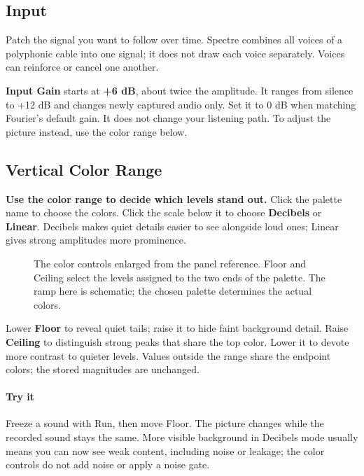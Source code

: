 \begingroup
\setlength{\parindent}{0pt}
\setlength{\parskip}{4pt}
\clearpage
\subsection{Input}

Patch the signal you want to follow over time. Spectre combines all voices
of a polyphonic cable into one signal; it does not draw each voice separately.
Voices can reinforce or cancel one another.

\textbf{Input Gain} starts at \textbf{+6 dB}, about twice the amplitude.
It ranges from silence to +12 dB and changes newly captured audio only.
Set it to 0 dB when matching Fourier's default gain. It does not change your
listening path. To adjust the picture instead, use the color range below.

\subsection{Vertical Color Range}

\textbf{Use the color range to decide which levels stand out.} Click the
palette name to choose the colors. Click the scale below it to choose
\textbf{Decibels} or \textbf{Linear}. Decibels makes quiet details easier
to see alongside loud ones; Linear gives strong amplitudes more prominence.

\begin{figure}[!htp]
\centering

\caption{The color controls enlarged from the panel reference. Floor and
Ceiling select the levels assigned to the two ends of the palette. The
ramp here is schematic; the chosen palette determines the actual colors.}
\end{figure}

Lower \textbf{Floor} to reveal quiet tails; raise it to hide faint background
detail. Raise \textbf{Ceiling} to distinguish strong peaks that share the top
color. Lower it to devote more contrast to quieter levels. Values outside
the range share the endpoint colors; the stored magnitudes are unchanged.

\paragraph{Try it}
Freeze a sound with Run, then move Floor. The picture changes while the
recorded sound stays the same. More visible background in Decibels mode
usually means you can now see weak content, including noise or leakage;
the color controls do not add noise or apply a noise gate.

